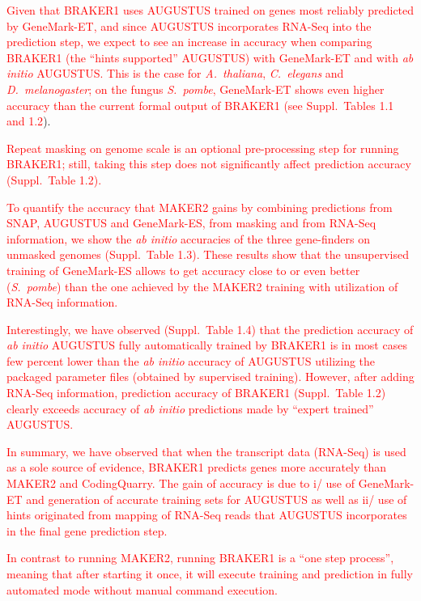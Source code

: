 \documentclass[a4paper,10pt]{article}
\begin{document}
\textcolor{red}{Given that BRAKER1 uses AUGUSTUS trained on genes most reliably predicted by GeneMark-ET, and since AUGUSTUS incorporates RNA-Seq into the prediction step, we expect to see an increase in accuracy when comparing BRAKER1 (the ``hints supported'' AUGUSTUS) with GeneMark-ET and with \textit{ab initio} AUGUSTUS. This is the case for \textit{A.~thaliana}, \textit{C.~elegans} and \textit{D.~melanogaster}; on the fungus \textit{S.~pombe}, GeneMark-ET shows even higher accuracy than the current formal output of BRAKER1 (see Suppl.~Tables 1.1 and 1.2}). 

\textcolor{red}{Repeat masking on genome scale is an optional pre-processing step for running BRAKER1; still, taking this step does not significantly affect prediction accuracy (Suppl.~Table 1.2).}

\textcolor{red}{To quantify the accuracy that MAKER2 gains by combining predictions from SNAP, AUGUSTUS and GeneMark-ES, from masking and from RNA-Seq information, we show the \textit{ab initio} accuracies of the three gene-finders on unmasked genomes (Suppl.~Table 1.3). These results show that the unsupervised training of GeneMark-ES allows to get accuracy close to or even better (\textit{S.~pombe}) than the one achieved by the MAKER2 training with utilization of RNA-Seq information.}

\textcolor{red}{Interestingly, we have observed (Suppl.~Table 1.4) that the prediction accuracy of \textit{ab initio} AUGUSTUS fully automatically trained by BRAKER1 is in most cases few percent lower than the \textit{ab initio} accuracy of AUGUSTUS utilizing the packaged parameter files (obtained by supervised training). However, after adding RNA-Seq information, prediction accuracy of BRAKER1 (Suppl.~Table 1.2) clearly exceeds accuracy of \textit{ab initio} predictions made by ``expert trained'' AUGUSTUS.}

\textcolor{red}{In summary, we have observed that when the transcript data (RNA-Seq) is used as a sole source of evidence, BRAKER1 predicts genes more accurately than MAKER2 and CodingQuarry. The gain of accuracy is due to i/ use of GeneMark-ET and generation of accurate training sets for AUGUSTUS as well as ii/ use of hints originated from mapping of RNA-Seq reads that AUGUSTUS incorporates in the final gene prediction step.}

\textcolor{red}{In contrast to running MAKER2, running BRAKER1 is a ``one step process'', meaning that after starting it once, it will execute training and prediction in fully automated mode without manual command execution.}
\end{document}
